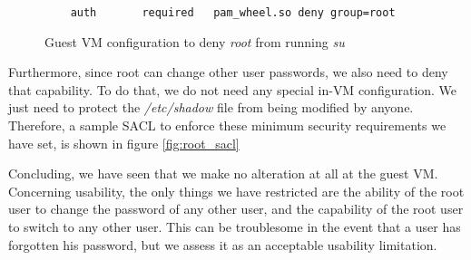 \begin{figure}[ht]
	\centering
	\footnotesize{\selectfont 
	\begin{lstlisting}
	auth       required   pam_wheel.so deny group=root	
	\end{lstlisting}}
	\caption{Guest \ac{VM} configuration to deny \emph{root} from running \emph{su}}
	\label{fig:pam}
\end{figure}

\par Furthermore, since root can change other user passwords, we also need to deny that capability. To do that, we do not need any special in-\ac{VM} configuration. We just need to protect the \textit{/etc/shadow} file from being modified by anyone. Therefore, a sample \ac{SACL} to enforce these minimum security requirements we have set, is shown in figure \ref{fig:root_sacl}


\par Concluding, we have seen that we make no alteration at all at the guest \ac{VM}. Concerning usability, the only things we have restricted are the ability of the root user to change the password of any other user, and the capability of the root user to switch to any other user. This can be troublesome in the event that a user has forgotten his password, but we assess it as an acceptable usability limitation.











